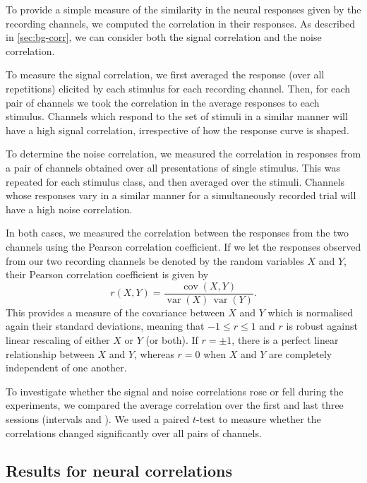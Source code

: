 To provide a simple measure of the similarity in the neural responses given by the recording channels, we computed the correlation in their responses.
As described in \autoref{sec:bg-corr}, we can consider both the signal correlation and the noise correlation.

To measure the signal correlation, we first averaged the response (over all repetitions) elicited by each stimulus for each recording channel.
Then, for each pair of channels we took the correlation in the average responses to each stimulus.
Channels which respond to the set of stimuli in a similar manner will have a high signal correlation, irrespective of how the response curve is shaped.

To determine the noise correlation, we measured the correlation in responses from a pair of channels obtained over all presentations of single stimulus.
This was repeated for each stimulus class, and then averaged over the stimuli.
Channels whose responses vary in a similar manner for a simultaneously recorded trial will have a high noise correlation.

In both cases, we measured the correlation between the responses from the two channels using the Pearson correlation coefficient.
If we let the responses observed from our two recording channels be denoted by the random variables $X$ and $Y$, their Pearson correlation coefficient is given by
\begin{equation}
\label{eq:pearson}
r(X,Y) = \frac{\operatorname{cov}(X,Y)}{\operatorname{var}(X) \, \operatorname{var}(Y)}
.\end{equation}
This provides a measure of the covariance between $X$ and $Y$ which is normalised again their standard deviations, meaning that $-1 \le r \le 1$ and $r$ is robust against linear rescaling of either $X$ or $Y$ (or both).
If $r=\pm1$, there is a perfect linear relationship between $X$ and $Y$, whereas $r=0$ when $X$ and $Y$ are completely independent of one another.

To investigate whether the signal and noise correlations rose or fell during the experiments, we compared the average correlation over the first and last three sessions (intervals  and ).
We used a paired $t$-test to measure whether the correlations changed significantly over all pairs of channels.


\subsection{Results for neural correlations}


